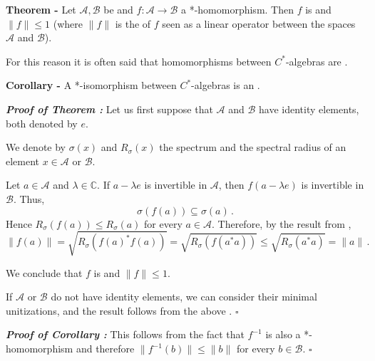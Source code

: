 \documentclass[12pt]{article}
\begin{document}
{\bf Theorem -} Let $\mathcal{A}, \mathcal{B}$ be  and $f:\mathcal{A} \longrightarrow \mathcal{B}$ a *-homomorphism. Then $f$ is  and $\|f\| \leq 1$ (where $\|f\|$ is the  of $f$ seen as a linear operator between the spaces $\mathcal{A}$ and $\mathcal{B}$).

For this reason it is often said that homomorphisms between $C^*$-algebras are .

{\bf Corollary -} A *-isomorphism between $C^*$-algebras is an .\\
$\;$

{\bf \emph{Proof of Theorem :}} Let us first suppose that $\mathcal{A}$ and $\mathcal{B}$ have identity elements, both denoted by $e$.

We denote by $\sigma(x)$ and $R_{\sigma}(x)$ the spectrum and the spectral radius of an element $x \in \mathcal{A}$ or $\mathcal{B}$.

Let $a \in \mathcal{A}$ and $\lambda \in \mathbb{C}$. If $a- \lambda e$ is invertible in $\mathcal{A}$, then $f(a- \lambda e)$ is invertible in $\mathcal{B}$.  Thus,
\begin{displaymath}
\sigma(f(a)) \subseteq \sigma(a)\,.
\end{displaymath}
Hence $R_{\sigma}(f(a)) \leq R_{\sigma}(a)$ for every $a \in \mathcal{A}$. Therefore, by the result from ,
\begin{displaymath}
\|f(a)\| = \sqrt{R_{\sigma}(f(a)^*f(a))} = \sqrt{R_{\sigma}(f(a^*a))} \leq \sqrt{R_{\sigma}(a^*a)}= \|a\|\,.
\end{displaymath}

We conclude that $f$ is  and $\|f\| \leq 1$.

If $\mathcal{A}$ or $\mathcal{B}$ do not have identity elements, we can consider their minimal unitizations, and the result follows from the above . $\square$

{\bf \emph{Proof of Corollary :}} This follows from the fact that $f^{-1}$ is also a *-homomorphism and therefore $\|f^{-1}(b)\|\leq \|b\|$ for every $b \in \mathcal{B}$. $\square$
\end{document}
